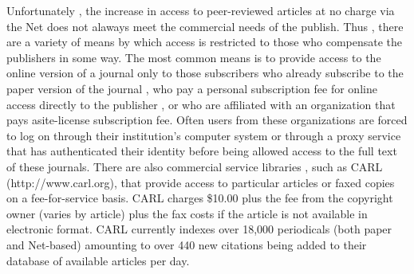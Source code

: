 \documentclass{article}
\begin{document}
Unfortunately , the increase in access to peer-reviewed articles at no charge via the Net does not alaways meet the commercial needs of the publish. Thus , there are a variety of means by which access is restricted to those who compensate the publishers in some way. The most common means is to provide access to the online version of a journal only to those subscribers who already subscribe to the paper version of the journal , who pay a personal subscription fee for online access directly to the publisher , or who are affiliated with an  organization that pays asite-license subscription fee. Often users from these organizations are forced to log on through their institution's computer system or through a proxy service that has  authenticated their identity before being allowed access to the full text of these journals. There are also commercial service libraries , such as CARL (http://www.carl.org), that provide access to particular articles or faxed copies on a fee-for-service basis. CARL charges \$10.00 plus the fee from the copyright owner (varies by article) plus the fax costs if the article is not available in electronic format. CARL currently indexes over 18,000 periodicals (both paper and Net-based) amounting to over 440 new citations being added to their database of available articles per day.
\end{document}

